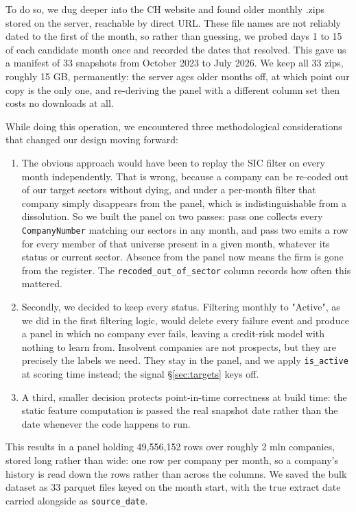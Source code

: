 \documentclass[    author={Samuel Menon Demelo; Sneha Saphala Ram Prasad; 
Viktor Ander Lindholm; Vishal Khatri},
               supervisor={Prof. Fernando Moreno-Pino},
                   degree={MSc},
                    title={Lloyds Commercial Banking Intelligence},
                 subtitle={Ranking SME Lending, Risk and Growth Prospects for Lloyds Banking Group},
                     type={},
                     year={2026}]{dissertation}
\begin{document}
To do so, we dug deeper into the CH website and found older monthly .zips stored on the server, reachable by direct URL. These file names are not reliably dated to the first of the month, so rather than guessing, we probed days 1 to 15 of each candidate month once and recorded the dates that resolved. This gave us a manifest of 33 snapshots from October 2023 to July 2026. We keep all 33 zips, roughly 15 GB, permanently: the server ages older months off, at which point our copy is the only one, and re-deriving the panel with a different column set then costs no downloads at all.

While doing this operation, we encountered three methodological considerations that changed our design moving forward:
\begin{enumerate}
    \item The obvious approach would have been to replay the SIC filter on every month independently. That is wrong, because a company can be re-coded out of our target sectors without dying, and under a per-month filter that company simply disappears from the panel, which is indistinguishable from a dissolution. So we built the panel on two passes: pass one collects every \texttt{CompanyNumber} matching our sectors in any month, and pass two emits a row for every member of that universe present in a given month, whatever its status or current sector. Absence from the panel now means the firm is gone from the register. The \texttt{recoded\_out\_of\_sector} column records how often this mattered.
    \item Secondly, we decided to keep every status. Filtering monthly to "Active", as we did in the first filtering logic, would delete every failure event and produce a panel in which no company ever fails, leaving a credit-risk model with nothing to learn from. Insolvent companies are not prospects, but they are precisely the labels we need. They stay in the panel, and we apply \texttt{is\_active} at scoring time instead; the signal \S\ref{sec:targets} keys off.
    \item A third, smaller decision protects point-in-time correctness at build time: the static feature computation is passed the real snapshot date rather than the date whenever the code happens to run.
\end{enumerate}

This results in a panel holding 49,556,152 rows over roughly 2 mln companies, stored long rather than wide: one row per company per month, so a company's history is read down the rows rather than across the columns. We saved the bulk dataset as 33 parquet files keyed on the month start, with the true extract date carried alongside as \texttt{source\_date}.
\end{document}
